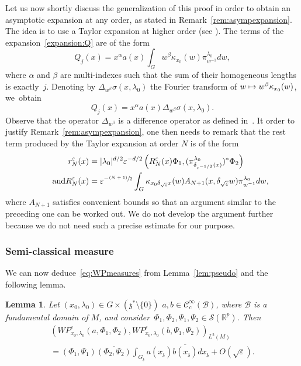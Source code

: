\documentclass[10pt]{amsart}
\let\mathcal\mathscr
\newcommand\mto{\mathchoice{\longmapsto}{\mapsto}{\mapsto}{\mapsto}}
\newcommand{\psfrac}[2]{\sfrac{(#1)}{#2}}
\theoremstyle{plain}
\newtheorem{lemma}[theorem]{Lemma}
\theoremstyle{definition}
\let\eps\varepsilon
\def\R{{\mathbb R}}
\begin{document}
Let us now shortly discuss the generalization of this proof in order to obtain an asymptotic expansion at any order, as stated in Remark~\ref{rem:asympexpansion}. The idea is to use a Taylor expansion at higher order (see \cite[\S3.1.8]{FR}). The terms of the expansion~\eqref{expansion:Q} are of the form
\[
Q_j(x)= x^\alpha a(x) \int_{G} w^\beta \kappa_{x_0}(w)\pi_{ w^{-1} }^{\lambda_0} dw,
\]
where $\alpha$ and $\beta$ are multi-indexes such that the sum of their homogeneous lengths is exactly~$j$.
Denoting by $\Delta_{w^\beta} \sigma(x,\lambda_0)$ the Fourier transform of $w\mto w^\beta \kappa_{x_0}(w)$, we~obtain
\[
Q_j(x)= x^\alpha a(x) \Delta_{w^\beta} \sigma(x,\lambda_0).
\]
Observe that the operator $\Delta_{w^\beta}$ is a difference operator as defined in~\cite{FR}.
It order to justify Remark~\ref{rem:asympexpansion}, one then needs to remark that the rest term produced by the Taylor expansion at order $N$ is of the form
\begin{align*}
r^\eps_N(x)&=
|\lambda_0|^{d/2}\eps^{-d/2} \left(R^\eps_N(x) \Phi_1,
(\pi^{\lambda_0}_{\delta_{\eps^{-1/2} }(x)})^*\Phi_2\right)
\\
\tag*{and}
R^\eps_N(x)&=\eps^{-\psfrac {N+1}2} \int_{G} \kappa_{x_0\delta_{\sqrt\eps} x}(w)
A_{N+1} (x, \delta_{\sqrt\eps} w)
\pi_{ w^{-1} }^{\lambda_0} dw,
\end{align*}
where $A_{N+1}$ satisfies convenient bounds so that an argument similar to the preceding one can be worked out. We do not develop the argument further because we do not need such a precise estimate for our purpose.

\subsubsection{Semi-classical measure}
We can now deduce~\eqref{eq:WPmeasures} from Lemma~\ref{lem:pseudo} and the following lemma.

\begin{lemma}\label{lem:WP2}
Let $(x_0,\lambda_0)\in G\times (\mathfrak z^*\setminus\{0\})$ $a,b\in\mathcal C^\infty_c(\mathcal B)$, where $\mathcal B$ is a fundamental domain of $M$, and consider~$\Phi_1,\Phi_2, \Psi_1,\Psi_2\in\mathcal S(\R^p)$.
Then
\begin{multline*}
\left(WP^\eps_{x_0,\lambda_0} (a,\Phi_1,\Phi_2),WP^\eps_{x_0,\lambda_0} (b,\Psi_1,\Psi_2)\right)_{L^2(M)}\\
=(\Phi_1,\Psi_1)\overline{(\Phi_2,\Psi_2)}
\int_{G_{\mathfrak z}} a(x_{\mathfrak z}) \overline{b(x_{\mathfrak z}) } dx_{\mathfrak z}
+O(\sqrt\eps).
\end{multline*}
\end{lemma}
\end{document}
